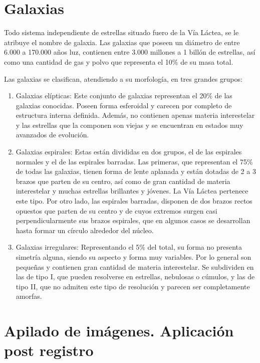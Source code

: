 \section{Galaxias}

Todo sistema independiente de estrellas situado fuero de la Vía
Láctea, se le atribuye el nombre de galaxia. Las galaxias que poseen
un diámetro de entre 6.000 a 170.000 años luz, contienen entre 3.000
millones a 1 billón de estrellas, así como una cantidad de gas y polvo
que representa el 10\% de su masa total.

Las galaxias se clasifican, atendiendo a su morfología, en tres grandes
grupos:

\begin{enumerate}[a]
  \item Galaxias elípticas: Este conjunto de galaxias representan el
  20\% de las galaxias conocidas. Poseen forma esferoidal y carecen
  por completo de estructura interna definida. Además, no contienen
  apenas materia interestelar y las estrellas que la componen son
  viejas y se encuentran en estados muy avanzados de evolución.
  \item Galaxias espirales: Estas están divididas en dos grupos, el de
  las espirales normales y el de las espirales barradas. Las primeras,
  que representan el 75\% de todas las galaxias, tienen forma de lente
  aplanada y están dotadas de 2 a 3 brazos que parten de su centro,
  así como de gran cantidad de materia interestelar y muchas estrellas
  brillantes y jóvenes. La Vía Láctea pertenece este tipo. Por otro
  lado, las espirales barradas, disponen de dos brazos rectos opuestos
  que parten de su centro y de cuyos extremos surgen casi
  perpendicularmente sus brazos espirales, que en algunos casos se
  desarrollan hasta formar un círculo alrededor del núcleo.
  \item Galaxias irregulares: Representando el 5\% del total, su forma
  no presenta simetría alguna, siendo su aspecto y forma muy
  variables. Por lo general son pequeñas y contienen gran cantidad de
  materia interestelar. Se subdividen en las de tipo I, que pueden
  resolverse en estrellas, nebulosas o cúmulos, y las de tipo II, que
  no admiten este tipo de resolución y parecen ser completamente
  amorfas.
\end{enumerate}

\section{Apilado de imágenes. Aplicación post registro}

